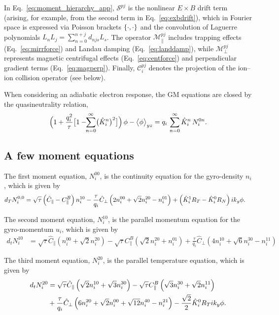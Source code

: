 \documentclass{article}
\begin{document}
In Eq.~\ref{eq:moment_hierarchy_app}, $\mathcal S^{pj}$ is the nonlinear  $E\times B$
drift term (arising, for example, from the second term in Eq.~\ref{eq:exbdrift}),
which in Fourier space is expressed via Poisson brackets $\left\{\cdot,\cdot\right\}$ 
and the convolution of Laguerre polynomials $L_nL_j=\sum_{n=0}^{n+j}d_{njs}L_s$. 
The operator $\mathcal M_{\parallel}^{pj}$ includes trapping effects 
(Eq.~\ref{eq:mirrforce}) and Landau damping (Eq.~\ref{eq:landdamp}), 
while $\mathcal M_{\perp}^{pj}$ represents magnetic centrifugal effects (Eq.~\ref{eq:centforce}) 
and perpendicular gradient terms (Eq.~\ref{eq:magperp}). 
Finally, $\mathcal C_i^{pj}$ denotes the projection of the ion--ion collision operator (see below).  
\par
When considering an adiabatic electron response, the GM equations are closed by the quasineutrality relation,
\begin{equation}
     \Bigl(1 + \frac{q_i^2}{\tau}\bigl[1-\!\!\sum_{n=0}^{\infty}\bigl(\hat K_{i}^n\bigr)^2\bigr]\Bigr)\,\phi  - \bigl\langle \phi \bigr\rangle_{y z} 
      =  q_i\,\sum_{n=0}^{\infty}\hat K_{i}^n\, N_i^{0n}.
    \label{ch5_eq:poisson_moments_adiabe}
\end{equation}

\subsection{A few moment equations}
The first moment equation, $N_i^{00}$, is the continuity equation for the gyro-density $n_i$, which is given by
\begin{align}
\label{eq:moment_0}
d_T N_i^{0,0}  &= \sqrt{\tau} \left( \hat{C}_{\parallel} - C^B_{\parallel} \right) n_i^{10}
- \frac{\tau}{q_i} \hat{C}_{\perp} \left(2 n_i^{00} + \sqrt{2} n_i^{20} - n_i^{01} \right)
+ \left(  \hat K_i^1 R_T - \hat K_i^0 R_N \right) i k_y  \phi.
\end{align}

The second moment equation, $N_i^{10}$, is the parallel momentum equation for the gyro-momentum $u_i$, which is given by
\begin{align}
\label{eq:moment_1}
d_t N_i^{10} &= \sqrt{\tau} \hat{C}_{\parallel} \left( n_i^{00} + \sqrt{2} n_i^{20} \right) 
    - \sqrt{\tau} C^B_{\parallel} \left( \sqrt{2} n_i^{20} + n_i^{01} \right)
    + \frac{\tau}{q_i} \hat{C}_{\perp} \left( 4 n_i^{10} + \sqrt{6} n_i^{30} - n_i^{11} \right)
\end{align}

The third moment equation, $N_i^{20}$, is the parallel temperature equation, which is given by
\begin{align}
\label{eq:moment_2}
d_t N_i^{20} &= \sqrt{\tau} \hat{C}_{\parallel} \left( \sqrt{2}n_i^{10} + \sqrt{3} n_i^{30} \right) 
    - \sqrt{\tau} C^B_{\parallel} \left( \sqrt{3}n_i^{30} + \sqrt{2} n_i^{11} \right) \nonumber\\
    &+ \frac{\tau}{q_i} \hat{C}_{\perp} \left( 6 n_i^{20} + \sqrt{2} n_i^{00} + \sqrt{12} n_i^{40} - n_i^{21} \right) 
    - \frac{\sqrt{2}}{2} \hat K_i^0  R_T  i k_y \phi.
\end{align}
\end{document}
